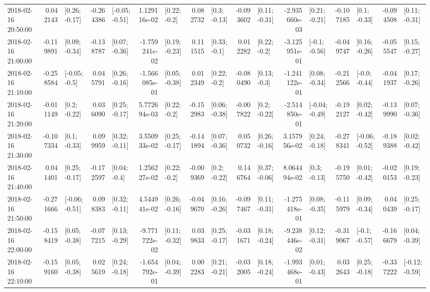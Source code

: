 \begin{tabular}{lrlrlrlrlrlrlrlrl}
2018-02-16 20:50:00 &  0.042143 &   [0.26; -0.17] & -0.264386 &  [-0.05; -0.51] &  1.129116e-02 &    [0.22; -0.2] &  0.082732 &    [0.3; -0.13] & -0.093602 &   [0.11; -0.31] & -2.935660e-03 &   [0.21; -0.21] & -0.107185 &    [0.1; -0.33] & -0.094508 &   [0.11; -0.31] \\
2018-02-16 21:00:00 & -0.119891 &   [0.09; -0.34] & -0.138787 &   [0.07; -0.36] & -1.759241e-02 &   [0.19; -0.23] &  0.111515 &    [0.33; -0.1] &  0.012282 &    [0.22; -0.2] & -3.125951e-01 &   [-0.1; -0.56] & -0.049747 &   [0.16; -0.26] & -0.055547 &   [0.15; -0.27] \\
2018-02-16 21:10:00 & -0.258584 &   [-0.05; -0.5] &  0.045791 &   [0.26; -0.16] & -1.566085e-01 &   [0.05; -0.38] &  0.012349 &    [0.22; -0.2] & -0.080490 &    [0.13; -0.3] & -1.241122e-01 &   [0.08; -0.34] & -0.212566 &   [-0.0; -0.44] & -0.041937 &   [0.17; -0.26] \\
2018-02-16 21:20:00 & -0.011149 &    [0.2; -0.22] &  0.036090 &   [0.25; -0.17] &  5.772694e-03 &    [0.22; -0.2] & -0.152983 &   [0.06; -0.38] & -0.007822 &    [0.2; -0.22] & -2.514850e-01 &  [-0.04; -0.49] & -0.192127 &   [0.02; -0.42] & -0.139990 &   [0.07; -0.36] \\
2018-02-16 21:30:00 & -0.107334 &    [0.1; -0.33] &  0.099959 &   [0.32; -0.11] &  3.550933e-02 &   [0.25; -0.17] & -0.141894 &   [0.07; -0.36] &  0.050732 &   [0.26; -0.16] &  3.157956e-02 &   [0.24; -0.18] & -0.278341 &  [-0.06; -0.52] & -0.189388 &   [0.02; -0.42] \\
2018-02-16 21:40:00 &  0.041401 &   [0.25; -0.17] & -0.172597 &    [0.04; -0.4] &  1.256227e-02 &    [0.22; -0.2] & -0.009369 &    [0.2; -0.22] &  0.146764 &   [0.37; -0.06] &  8.064494e-02 &    [0.3; -0.13] & -0.195750 &   [0.01; -0.42] & -0.020153 &   [0.19; -0.23] \\
2018-02-16 21:50:00 & -0.271666 &  [-0.06; -0.51] &  0.098383 &   [0.32; -0.11] &  4.544941e-02 &   [0.26; -0.16] & -0.049670 &   [0.16; -0.26] & -0.097467 &   [0.11; -0.31] & -1.275418e-01 &   [0.08; -0.35] & -0.115979 &   [0.09; -0.34] &  0.040439 &   [0.25; -0.17] \\
2018-02-16 22:00:00 & -0.158419 &   [0.05; -0.38] & -0.077215 &   [0.13; -0.29] & -9.771722e-02 &   [0.11; -0.32] &  0.039833 &   [0.25; -0.17] & -0.031671 &   [0.18; -0.24] & -9.238446e-02 &   [0.12; -0.31] & -0.319067 &   [-0.1; -0.57] & -0.166679 &   [0.04; -0.39] \\
2018-02-16 22:10:00 & -0.159160 &   [0.05; -0.38] &  0.025619 &   [0.24; -0.18] & -1.654792e-01 &   [0.04; -0.39] &  0.002283 &   [0.21; -0.21] & -0.032005 &   [0.18; -0.24] & -1.993468e-01 &   [0.01; -0.43] &  0.032643 &   [0.25; -0.18] & -0.337222 &  [-0.12; -0.59] \\

\end{tabular}
